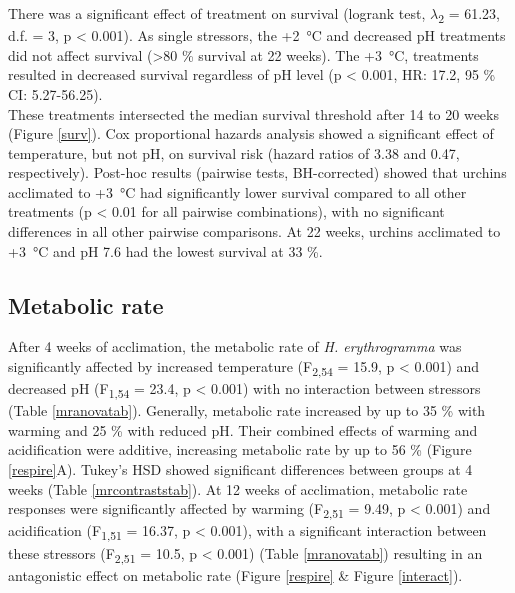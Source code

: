 \documentclass[a4paper,10pt, oneside]{memoir}
\begin{document}
There was a significant effect of treatment on survival (logrank test, \(\lambda\)\textsubscript{2} = 61.23, d.f. = 3, p \textless{} 0.001).
As single stressors, the +\SI{2}{\celsius} and decreased pH treatments did not affect survival (\textgreater{}80 \% survival at 22 weeks).
The +\SI{3}{\celsius}, treatments resulted in decreased survival regardless of pH level (p \textless{} 0.001, HR: 17.2, 95 \% CI: 5.27-56.25).\\
These treatments intersected the median survival threshold after 14 to 20 weeks (Figure \ref{surv}).
Cox proportional hazards analysis showed a significant effect of temperature, but not pH, on survival risk (hazard ratios of 3.38 and 0.47, respectively).
Post-hoc results (pairwise tests, BH-corrected) showed that urchins acclimated to +\SI{3}{\celsius} had significantly lower survival compared to all other treatments (p \textless{} 0.01 for all pairwise combinations), with no significant differences in all other pairwise comparisons.
At 22 weeks, urchins acclimated to +\SI{3}{\celsius} and pH 7.6 had the lowest survival at 33 \%.

\hypertarget{metabolic-rate-3}{%
\subsection{Metabolic rate}\label{metabolic-rate-3}}

After 4 weeks of acclimation, the metabolic rate of \textit{H. erythrogramma} was significantly affected by increased temperature (\si{F_{2,54}} = 15.9, p \textless{} 0.001) and decreased pH (\si{F_{1,54}} = 23.4, p \textless{} 0.001) with no interaction between stressors (Table \ref{mranovatab}).
Generally, metabolic rate increased by up to 35 \% with warming and 25 \% with reduced pH.
Their combined effects of warming and acidification were additive, increasing metabolic rate by up to 56 \% (Figure \ref{respire}A). Tukey's HSD showed significant differences between groups at 4 weeks (Table \ref{mrcontraststab}).
At 12 weeks of acclimation, metabolic rate responses were significantly affected by warming (\si{F_{2,51}} = 9.49, p \textless{} 0.001) and acidification (\si{F_{1,51}} = 16.37, p \textless{} 0.001), with a significant interaction between these stressors (\si{F_{2,51}} = 10.5, p \textless{} 0.001) (Table \ref{mranovatab}) resulting in an antagonistic effect on metabolic rate (Figure \ref{respire} \& Figure \ref{interact}).
\end{document}
